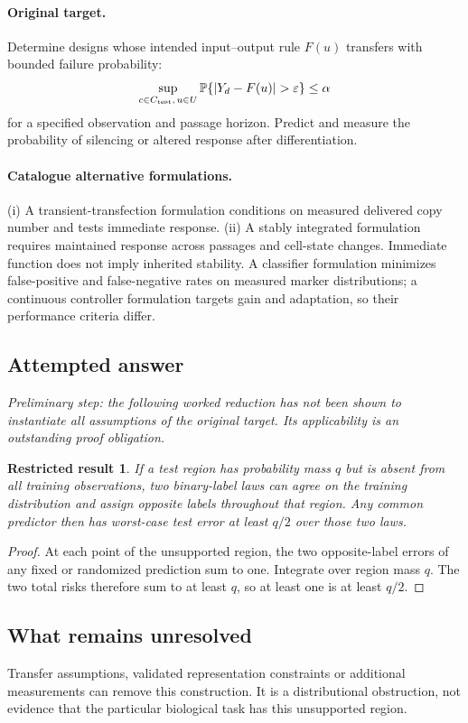 \documentclass[11pt]{article}
\newcommand{\Prob}{\mathbb P}
\providecommand{\Prob}{\mathbb P}
\newtheorem{attemptresult}{Restricted result}[section]
\begin{document}
\paragraph{Original target.}
Determine designs whose intended input--output rule $F(u)$ transfers with bounded failure probability:
\[
\sup_{c\in C_{\rm test},\,u\in U}
\Prob\{|Y_d-F(u)|>\varepsilon\}\leq\alpha
\]
for a specified observation and passage horizon. Predict and measure the probability of silencing or altered response after differentiation.
\paragraph{Catalogue alternative formulations.}
(i) A transient-transfection formulation conditions on measured delivered copy number and tests immediate response. (ii) A stably integrated formulation requires maintained response across passages and cell-state changes. Immediate function does not imply inherited stability. A classifier formulation minimizes false-positive and false-negative rates on measured marker distributions; a continuous controller formulation targets gain and adaptation, so their performance criteria differ.
\subsection{Attempted answer}
\noindent\emph{Preliminary step: the following worked reduction has not been shown to instantiate all assumptions of the original target. Its applicability is an outstanding proof obligation.}

\begin{attemptresult}
If a test region has probability mass $q$ but is absent from all training observations, two binary-label laws can agree on the training distribution and assign opposite labels throughout that region. Any common predictor then has worst-case test error at least $q/2$ over those two laws.
\end{attemptresult}
\begin{proof}
At each point of the unsupported region, the two opposite-label errors of any fixed or randomized prediction sum to one. Integrate over region mass $q$. The two total risks therefore sum to at least $q$, so at least one is at least $q/2$.
\end{proof}
\subsection{What remains unresolved}
Transfer assumptions, validated representation constraints or additional measurements can remove this construction. It is a distributional obstruction, not evidence that the particular biological task has this unsupported region.
\end{document}
